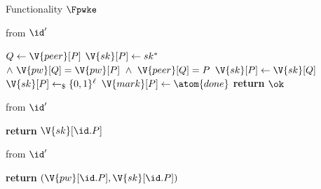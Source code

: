 \begin{interface}[nofloat]{Functionality $\Fpwke$ \\
\params{$\PID$, \quad $\Ps$, \quad $\admits$, \quad
$\uses := \{(\Adv,\serves)\}$, \quad $\pars := \ell$}}
{\begin{multicols}{2}
 \quad from $\id'$
\begin{algorithmic}[1]
\algcont
{}
\State $Q \gets \V{peer}[P]$
  \State $\V{sk}[P] \gets sk^{*}$ \label{ln:pwadvkey}
\EndIf
{}
\Statex \quad\ $\wedge\ \V{pw}[Q] = \V{pw}[P] \ \wedge\ \V{peer}[Q] = P$
  \State $\V{sk}[P] \gets \V{sk}[Q]$ \label{ln:pwmatch}
\EndIf
{}
  \State $\V{sk}[P] \gets_{\$} \{0,1\}^{\ell}$ \label{ln:pwrandom}
\EndIf
\State $\V{mark}[P] \gets \atom{done}$
\State \textbf{return} $\ok$
\algsave
\end{algorithmic}
\vspace{1.4ex}

 \quad from $\id'$
\begin{algorithmic}[1]
\algcont
{}
\State \textbf{return} $\V{sk}[\id.P]$ \label{ln:pwout}
\algsave
\end{algorithmic}
\vspace{1.4ex}

 \quad from $\id'$
\begin{algorithmic}[1]
\algcont
\State \textbf{return} $(\V{pw}[\id.P], \V{sk}[\id.P])$ \label{ln:pwleakall}
\algsave
\end{algorithmic}
\end{multicols}}
\end{interface}
